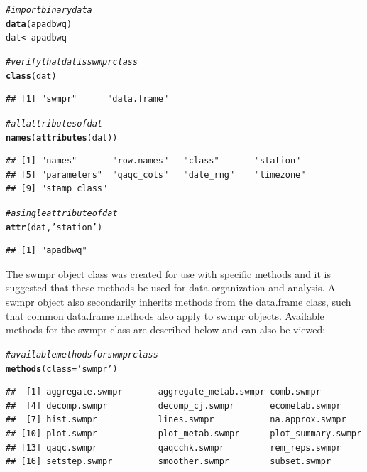 \documentclass[10pt,letterpaper]{article}\usepackage[]{graphicx}\usepackage[]{color}
\makeatletter
\newcommand{\hlstr}[1]{\textcolor[rgb]{0.192,0.494,0.8}{#1}}%
\newcommand{\hlcom}[1]{\textcolor[rgb]{0.678,0.584,0.686}{\textit{#1}}}%
\newcommand{\hlstd}[1]{\textcolor[rgb]{0.345,0.345,0.345}{#1}}%
\newcommand{\hlkwb}[1]{\textcolor[rgb]{0.69,0.353,0.396}{#1}}%
\newcommand{\hlkwc}[1]{\textcolor[rgb]{0.333,0.667,0.333}{#1}}%
\newcommand{\hlkwd}[1]{\textcolor[rgb]{0.737,0.353,0.396}{\textbf{#1}}}%
\newenvironment{kframe}{%
 \def\at@end@of@kframe{}%
 \ifinner\ifhmode%
  \def\at@end@of@kframe{\end{minipage}}%
  \begin{minipage}{\columnwidth}%
 \fi\fi%
 \def\FrameCommand##1{\hskip\@totalleftmargin \hskip-\fboxsep
 \colorbox{shadecolor}{##1}\hskip-\fboxsep
     \hskip-\linewidth \hskip-\@totalleftmargin \hskip\columnwidth}%
 \MakeFramed {\advance\hsize-\width
   \@totalleftmargin\z@ \linewidth\hsize
   \@setminipage}}%
 {\par\unskip\endMakeFramed%
 \at@end@of@kframe}
\newenvironment{knitrout}{}{} %
\makeatother
\begin{document}
\begin{knitrout}
\color{fgcolor}\begin{kframe}
\begin{alltt}
\hlcom{# import binary data}
\hlkwd{data}\hlstd{(apadbwq)}
\hlstd{dat} \hlkwb{<-} \hlstd{apadbwq}

\hlcom{# verify that dat is swmpr class}
\hlkwd{class}\hlstd{(dat)}
\end{alltt}
\begin{verbatim}
## [1] "swmpr"      "data.frame"
\end{verbatim}
\begin{alltt}
\hlcom{# all attributes of dat}
\hlkwd{names}\hlstd{(}\hlkwd{attributes}\hlstd{(dat))}
\end{alltt}
\begin{verbatim}
## [1] "names"       "row.names"   "class"       "station"    
## [5] "parameters"  "qaqc_cols"   "date_rng"    "timezone"   
## [9] "stamp_class"
\end{verbatim}
\begin{alltt}
\hlcom{# a single attribute of dat}
\hlkwd{attr}\hlstd{(dat,} \hlstr{'station'}\hlstd{)}
\end{alltt}
\begin{verbatim}
## [1] "apadbwq"
\end{verbatim}
\end{kframe}
\end{knitrout}
 
The swmpr object class was created for use with specific methods and it is suggested that these methods be used for data organization and analysis.  A swmpr object also secondarily inherits methods from the data.frame class, such that common data.frame methods also apply to swmpr objects.  Available methods for the swmpr class are described below and can also be viewed:
 
\begin{knitrout}
\color{fgcolor}\begin{kframe}
\begin{alltt}
\hlcom{# available methods for swmpr class}
\hlkwd{methods}\hlstd{(}\hlkwc{class} \hlstd{=} \hlstr{'swmpr'}\hlstd{)}
\end{alltt}
\begin{verbatim}
##  [1] aggregate.swmpr       aggregate_metab.swmpr comb.swmpr           
##  [4] decomp.swmpr          decomp_cj.swmpr       ecometab.swmpr       
##  [7] hist.swmpr            lines.swmpr           na.approx.swmpr      
## [10] plot.swmpr            plot_metab.swmpr      plot_summary.swmpr   
## [13] qaqc.swmpr            qaqcchk.swmpr         rem_reps.swmpr       
## [16] setstep.swmpr         smoother.swmpr        subset.swmpr
\end{verbatim}
\end{kframe}
\end{knitrout}
\end{document}
